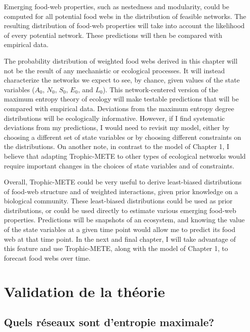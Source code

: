 Emerging food-web properties, such as nestedness and modularity, could be
computed for all potential food webs in the distribution of feasible networks.
The resulting distribution of food-web properties will take into account the
likelihood of every potential network. These predictions will then be compared
with empirical data.

The probability distribution of weighted food webs derived in this chapter will
not be the result of any mechanistic or ecological processes. It will instead
characterize the networks we expect to see, by chance, given values of the state
variables ($A_0$, $N_0$, $S_0$, $E_0$, and $L_0$). This network-centered version
of the maximum entropy theory of ecology will make testable predictions that
will be compared with empirical data. Deviations from the maximum entropy degree
distributions will be ecologically informative. However, if I find systematic
deviations from my predictions, I would need to revisit my model, either by
choosing a different set of state variables or by choosing different constraints
on the distributions. On another note, in contrast to the model of Chapter 1, I
believe that adapting Trophic-METE to other types of ecological networks would
require important changes in the choices of state variables and of constraints.

Overall, Trophic-METE could be very useful to derive least-biased distributions
of food-web structure and of weighted interactions, given prior knowledge on a
biological community. These least-biased distributions could be used as prior
distributions, or could be used directly to estimate various emerging food-web
properties. Predictions will be snapshots of an ecosystem, and knowing the value
of the state variables at a given time point would allow me to predict its food
web at that time point. In the next and final chapter, I will take advantage of
this feature and use Trophic-METE, along with the model of Chapter 1, to
forecast food webs over time.


\section{Validation de la théorie} 

\subsection{Quels réseaux sont d'entropie maximale?} 

